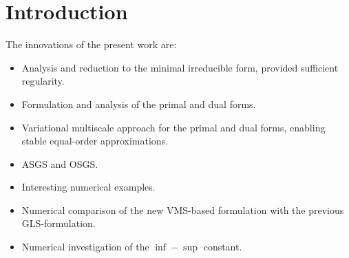 
\section{Introduction}

The innovations of the present work are:

\begin{itemize}
    \item Analysis and reduction to the minimal irreducible form, provided sufficient regularity.
    \item Formulation and analysis of the primal and dual forms.
    \item Variational multiscale approach for the primal and dual forms, enabling stable equal-order approximations.
    \item ASGS and OSGS.
    \item Interesting numerical examples.
    \item Numerical comparison of the new VMS-based formulation with the previous GLS-formulation.
    \item Numerical investigation of the $\inf-\sup$ constant.
\end{itemize}
